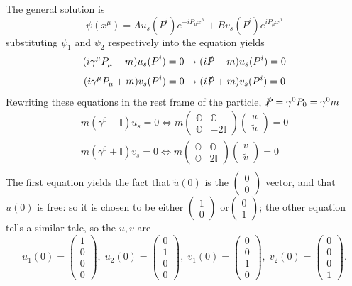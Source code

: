 The general solution is
$$\psi(x^\mu) = Au_s(P^i)e^{-iP_\mu x^\mu}+ Bv_s(P^i)e^{iP_\mu x^\mu}$$
substituting $\psi_1$ and $\psi_2$ respectively into the equation yields
$$(i\gamma^\mu P_\mu -m)u_s(P^i) = 0 \to (i\slashed{P}-m)u_s(P^i)=0$$
$$(i\gamma^\mu P_\mu +m)v_s(P^i) = 0 \to (i\slashed{P}+m)v_s(P^i)=0$$
Rewriting these equations in the rest frame of the particle, 
$\slashed{P} = \gamma^0P_0 = \gamma^0m$
\begin{gather*}
m(\gamma^0-\mathbb{I})u_s = 0
\iff m\begin{pmatrix}
    \mathbb{O}&\mathbb{O}\\
    \mathbb{O}&-2\mathbb{I}
\end{pmatrix}\begin{pmatrix}
u\\\tilde u
\end{pmatrix} = 0\\
m(\gamma^0+\mathbb{I})v_s = 0
\iff m\begin{pmatrix}
    \mathbb{O}&\mathbb{O}\\
    \mathbb{O}&2\mathbb{I}
\end{pmatrix}\begin{pmatrix}
v\\\tilde v
\end{pmatrix} = 0\\
\end{gather*}
The first equation yields the fact that $\tilde u(0)$ is the $\begin{pmatrix}0\\0
\end{pmatrix}$ vector, and that $u(0)$ is free: so it is chosen to be either
$\begin{pmatrix}1\\0\end{pmatrix}$ or$\begin{pmatrix}0\\1\end{pmatrix}$;
the other equation tells a similar tale, so the $u,v$ are
$$
u_1(0) = \begin{pmatrix}1\\0\\0\\0\end{pmatrix},\;
u_2(0) = \begin{pmatrix}0\\1\\0\\0\end{pmatrix},\;
v_1(0) = \begin{pmatrix}0\\0\\1\\0\end{pmatrix},\;
v_2(0) = \begin{pmatrix}0\\0\\0\\1\end{pmatrix}.
$$
